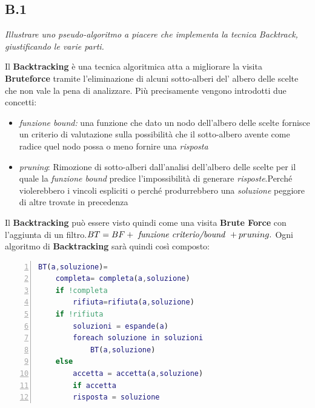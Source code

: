 \documentclass[a4paper]{article}
\begin{document}
\subsection{B.1}
\emph{Illustrare uno pseudo-algoritmo a piacere che implementa la tecnica Backtrack, giustificando le varie parti.}

Il \textbf{Backtracking} è una tecnica algoritmica atta a migliorare la visita \textbf{Bruteforce} tramite l'eliminazione di alcuni sotto-alberi del' albero delle scelte che non vale la pena di analizzare.
Più precisamente vengono introdotti due concetti:
\begin{itemize}
	\item \textit{funzione bound:} una funzione che dato un nodo dell'albero delle scelte fornisce un criterio di valutazione sulla possibilità che il sotto-albero avente come radice quel nodo possa o meno fornire una \textit{risposta}
	\item \textit{pruning}: Rimozione di sotto-alberi dall'analisi dell'albero delle scelte per il quale la \textit{funzione bound} predice l'impossibilità di generare \textit{risposte}.Perché violerebbero i vincoli espliciti o perché produrrebbero una \textit{soluzione} peggiore di altre trovate in precedenza
\end{itemize}
Il \textbf{Backtracking} può essere visto quindi come una visita \textbf{Brute Force} con l'aggiunta di un filtro.$BT = BF + \text{ \textit{funzione criterio/bound} }+ pruning.$
Ogni algoritmo di \textbf{Backtracking} sarà quindi così composto:
\begin{lstlisting}[numbers=left,firstnumber=1,stepnumber=1, xleftmargin=15pt, language=Matlab ]
BT(a,soluzione)=
    completa= completa(a,soluzione)
    if !completa
        rifiuta=rifiuta(a,soluzione)
	if !rifiuta
	    soluzioni = espande(a)
	    foreach soluzione in soluzioni
	        BT(a,soluzione)
    else
    	accetta = accetta(a,soluzione)
        if accetta
	    risposta = soluzione
\end{lstlisting}
\end{document}
